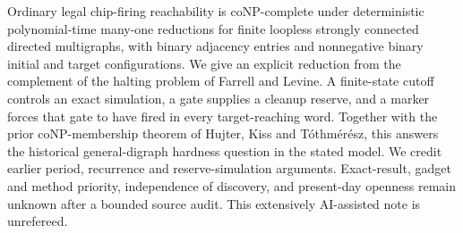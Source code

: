 Ordinary legal chip-firing reachability is coNP-complete under deterministic
polynomial-time many-one reductions for finite loopless strongly connected
directed multigraphs, with binary adjacency entries and nonnegative binary
initial and target configurations. We give an explicit reduction from the
complement of the halting problem of Farrell and Levine. A finite-state
cutoff controls an exact simulation, a gate supplies a cleanup reserve, and
a marker forces that gate to have fired in every target-reaching word.
Together with the prior coNP-membership theorem of Hujter, Kiss and
T\'othm\'er\'esz, this answers the historical general-digraph hardness
question in the stated model. We credit earlier period, recurrence and
reserve-simulation arguments. Exact-result, gadget and method priority,
independence of discovery, and present-day openness remain unknown after a
bounded source audit. This extensively AI-assisted note is unrefereed.
